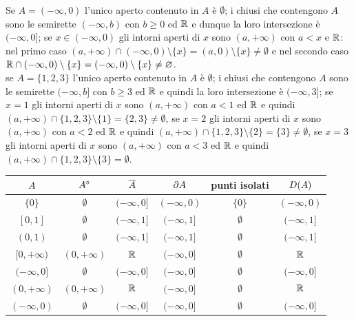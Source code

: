 \documentclass[a4paper]{article}\par \usepackage{style}\par
\begin{document}
Se $ A = (-\infty, 0) $ l'unico aperto contenuto in $ A $ è $ \emptyset $; i chiusi che contengono $ A $ sono le semirette $ (-\infty, b) $ con $ b \geq 0 $ ed $ \mathbb{R} $ e dunque la loro intersezione è $ (-\infty, 0] $; se $ x \in (-\infty, 0) $ gli intorni aperti di $ x $ sono $ (a, +\infty) $ con $ a < x $ e $ \mathbb{R} $: nel primo caso $ (a, +\infty) \cap (-\infty, 0) \setminus \{x\} = (a, 0) \setminus \{x\} \neq \emptyset $ e nel secondo caso $ \mathbb{R} \cap (-\infty, 0) \setminus \{x\} = (-\infty, 0) \setminus \{x\} \neq \varnothing $. \\
se $ A = \{1, 2, 3\} $ l'unico aperto contenuto in $ A $ è $ \emptyset $; i chiusi che contengono $ A $ sono le semirette $ (-\infty, b] $ con $ b \geq 3 $ ed $ \mathbb{R} $ e quindi la loro intersezione è $ (-\infty, 3] $; se $ x = 1 $ gli intorni aperti di $ x $ sono $ (a, +\infty) $ con $ a < 1 $ ed $ \mathbb{R} $ e quindi $ (a, +\infty) \cap \{1, 2, 3\} \setminus \{1\} = \{2, 3\} \neq \emptyset $, se $ x = 2 $ gli intorni aperti di $ x $ sono $ (a, +\infty) $ con $ a < 2 $ ed $ \mathbb{R} $ e quindi $ (a, +\infty) \cap \{1, 2, 3\} \setminus \{2\} = \{3\} \neq \emptyset $, se $ x = 3 $ gli intorni aperti di $ x $ sono $ (a, +\infty) $ con $ a < 3 $ ed $ \mathbb{R} $ e quindi $ (a, +\infty) \cap \{1, 2, 3\} \setminus \{3\} = \emptyset $.\par \begin{table}[h]
  \centering
  \begin{tabular}{c|ccccc}
    $ A $       &   $ {A}^{\circ} $    &   $ \overline{A} $    &   $ \partial{A} $   & punti isolati &   $ D{(A)} $    \\ \hline\hline
    $ \{0\} $     &  $ \emptyset $   & $ (-\infty, 0] $ & $ (-\infty, 0) $ &   $ \{0\} $   & $ (-\infty, 0) $ \\
    $ [0, 1] $    &  $ \emptyset $   & $ (-\infty, 1] $ & $ (-\infty, 1] $ & $ \emptyset $ & $ (-\infty, 1] $ \\
    $ (0, 1) $    &  $ \emptyset $   & $ (-\infty, 1] $ & $ (-\infty, 1] $ & $ \emptyset $ & $ (-\infty, 1] $ \\
    $ [0, +\infty) $ & $ (0, +\infty) $ &      $ \mathbb{R} $      & $ (-\infty, 0] $ & $ \emptyset $ &      $ \mathbb{R} $      \\
    $ (-\infty, 0] $ &  $ \emptyset $   & $ (-\infty, 0] $ & $ (-\infty, 0] $ & $ \emptyset $ & $ (-\infty, 0] $ \\
    $ (0, +\infty) $ & $ (0, +\infty) $ &      $ \mathbb{R} $      & $ (-\infty, 0] $ & $ \emptyset $ &      $ \mathbb{R} $      \\
    $ (-\infty, 0) $ &  $ \emptyset $   & $ (-\infty, 0] $ & $ (-\infty, 0] $ & $ \emptyset $ & $ (-\infty, 0] $ \\

\end{tabular}
\end{table}
\end{document}
